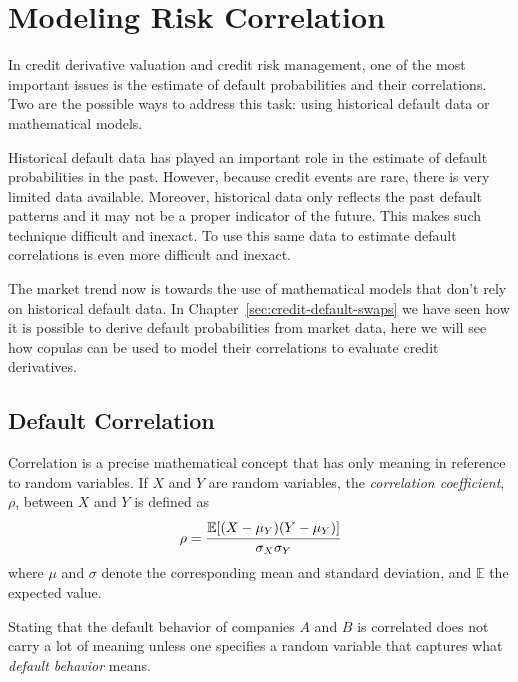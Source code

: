 \chapter{Modeling Risk Correlation}

In credit derivative valuation and credit risk management, one of the most important issues is the estimate of default probabilities and their correlations. Two are the possible ways to address this task: using historical default data or mathematical models.

Historical default data has played an important role in the estimate of default probabilities in the past. However, because credit events are rare, there is very limited data available. Moreover, historical data only reflects the past default patterns and it may not be a proper indicator of the future. This makes such technique difficult and inexact. To use this same data to estimate default correlations is even more difficult and inexact.

The market trend now is towards the use of mathematical models that don't rely on historical default data. In Chapter~\ref{sec:credit-default-swaps} we have seen how it is possible to derive default probabilities from market data, here we will see how copulas can be used to model their correlations to evaluate credit derivatives. 

\section{Default Correlation}
\label{sec:default_correlation}

Correlation is a precise mathematical concept that has only meaning in reference to random variables. If $X$ and $Y$ are random variables, the \emph{correlation coefficient}, $\rho$, between $X$ and $Y$ is defined as
\begin{equation}
\rho = \cfrac{\mathbb{E}[(X-\mu_Y)(Y-\mu_Y)]}{\sigma_X \sigma_Y}
\label{eq:correlation_coefficient}
\end{equation}
where $\mu$ and $\sigma$ denote the corresponding mean and standard deviation, and $\mathbb{E}$ the expected value.

Stating that the default behavior of companies $A$ and $B$ is correlated does not carry a lot of meaning unless one specifies a random variable that captures what \emph{default behavior} means.

